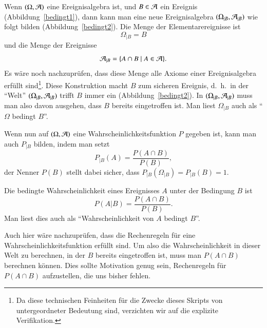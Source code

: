 Wenn $(\Omega, {\cal A})$ eine Ereignisalgebra ist, und 
$B\in{\cal A}$ ein Ereignis (Abbildung~\ref{bedingt1}),
dann kann man eine neue Ereignisalgebra
$(\Omega_{|B}, {\cal A}_{|B})$ wie folgt bilden (Abbildung~\ref{bedingt2}).
Die Menge der Elementarereignisse ist
\[
\Omega_{|B}=B
\]
und die Menge der Ereignisse
\[
{\cal A}_{|B}=\{A\cap B\;|\; A\in{\cal A}\}.
\]
Es wäre noch nachzuprüfen, dass diese Menge alle Axiome einer
Ereignisalgebra erfüllt sind\footnote{Da diese technischen Feinheiten 
für die Zwecke dieses Skripts von untergeordneter Bedeutung sind, verzichten
wir auf die explizite Verifikation.}.
Diese Konstruktion macht $B$ zum sicheren Ereignis, d.~h.~in der ``Welt''
$(\Omega_{|B},{\cal A}_{|B})$ trifft $B$ immer ein (Abbildung~\ref{bedingt2}).
In $(\Omega_{|B},{\cal A}_{|B})$ muss man also davon ausgehen, dass $B$
bereits eingetroffen ist.
Man liest $\Omega_{|B}$ auch als ``$\Omega$ bedingt $B$''.

Wenn nun auf $(\Omega, {\cal A})$ eine Wahrscheinlichkeitsfunktion $P$
gegeben ist, kann man auch $P_{|B}$ bilden, indem man setzt
\begin{equation*}
P_{|B}(A)=\frac{P(A\cap B)}{P(B)},
\end{equation*}
der Nenner $P(B)$ stellt dabei sicher, dass $P_{|B}(\Omega_{|B})=P_{|B}(B)=1$.

\begin{definition}
\label{def-bedingte-wahrscheinlichkeit}
Die bedingte Wahrscheinlichkeit eines Ereignisses $A$ unter der Bedingung
$B$ ist
\[
P(A|B)=\frac{P(A\cap B)}{P(B)}.
\]
Man liest dies auch als ``Wahrscheinlichkeit von $A$ bedingt $B$''.
\end{definition}

Auch hier wäre nachzuprüfen, dass die Rechenregeln für eine
Wahrscheinlichkeitsfunktion erfüllt sind.
Um also die Wahrscheinlichkeit in dieser Welt zu berechnen,
in der $B$ bereits eingetroffen ist, 
muss man $P(A\cap B)$ berechnen können.
Dies sollte Motivation genug sein, Rechenregeln für
$P(A\cap B)$ aufzustellen, die uns bisher fehlen.

